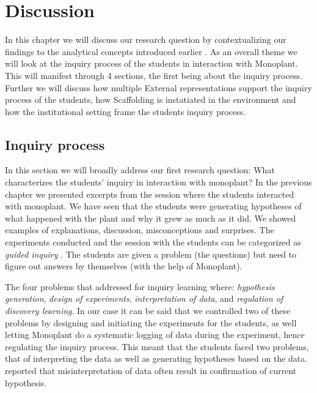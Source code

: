 \chapter{Discussion}
In this chapter we will discuss our research question by contextualizing our findings to the analytical concepts introduced earlier . As an overall theme we will look at the inquiry process of the students in interaction with Monoplant. This will manifest through 4 sections, the first being about the inquiry process. Further we will discuss how multiple External representations support the inquiry process of the students, how Scaffolding is instatiated in the environment and how the institutional setting frame the students inquiry process.

\section{Inquiry process}
In this section we will broadly address our first research question: What characterizes the students’ inquiry in interaction with monoplant? 
In the previous chapter we presented excerpts from the session where the students interacted with monoplant. We have seen that the students were generating hypotheses of what happened with the plant and why it grew as much as it did. We showed examples of explanations, discussion, misconceptions and surprises. 
The experiments conducted and the session with the students can be categorized as \emph{guided inquiry} \citeauthor*{staver1987analysis} \citetext{\citeyear{staver1987analysis}, referenced in \citealp{prince2006inductive}}. The students are given a problem (the questions) but need to figure out answers by themselves (with the help of Monoplant). 

The four problems that \citep{de1998scientific} addressed for inquiry learning where: \textit{hypothesis generation}, \textit{design of experiments}, \textit{interpretation of data}, and \textit{regulation of discovery learning}. In our case it can be said that we controlled two of these problems by designing and initiating the experiments for the students, as well letting Monoplant do a systematic logging of data during the experiment, hence regulating the inquiry process. This meant that the students faced two problems, that of interpreting the data as well as generating hypotheses based on the data. \citeauthor*{klahr1993heuristics} \citetext{\citeyear{klahr1993heuristics}, referenced in \citealp{de1998scientific}} reported that misinterpretation of data often result in confirmation of current hypothesis. 

